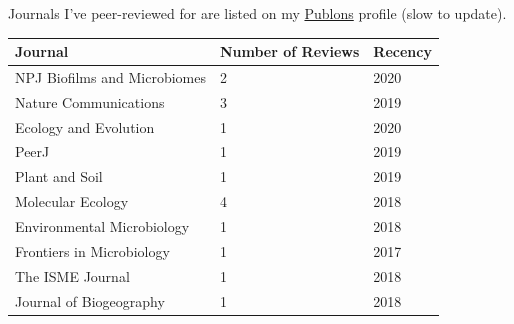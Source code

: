 \documentclass{article}
\begin{document}
Journals I've peer-reviewed for are listed on my \href{https://publons.com/researcher/1262170/john-l-darcy/peer-review/}{Publons} profile (slow to update). 
\\\begin{tabular}{l l l}
  Journal & Number of Reviews & Recency\\
  \hline
  NPJ Biofilms and Microbiomes & 2 & 2020\\
  Nature Communications & 3 & 2019\\
  Ecology and Evolution & 1 & 2020\\
  PeerJ & 1 & 2019\\
  Plant and Soil & 1 & 2019\\
  Molecular Ecology & 4 & 2018\\
  Environmental Microbiology & 1 & 2018\\
  Frontiers in Microbiology & 1 & 2017\\
  The ISME Journal & 1 & 2018\\
  Journal of Biogeography & 1 & 2018\\
\end{tabular}
\vspace{3mm}
\end{document}
